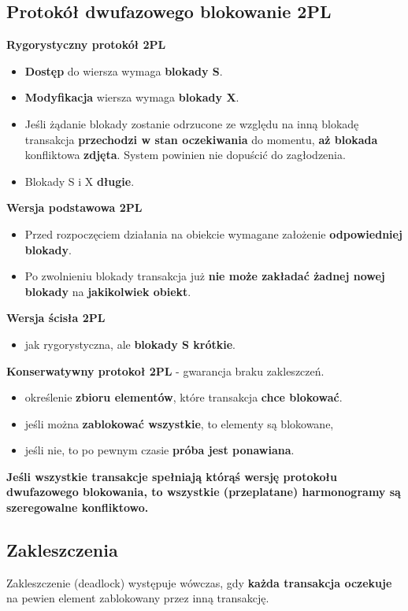 \documentclass[a4paper]{article}
\begin{document}
\subsection{Protokół dwufazowego blokowanie 2PL}
\textbf{Rygorystyczny protokół 2PL}
\begin{itemize}
    \item \textbf{Dostęp} do wiersza wymaga \textbf{blokady S}.
    \item \textbf{Modyfikacja} wiersza wymaga \textbf{blokady X}.
    \item Jeśli	żądanie	blokady	zostanie odrzucone ze względu na inną blokadę transakcja \textbf{ przechodzi w stan oczekiwania} do momentu, \textbf{aż blokada} konfliktowa \textbf{zdjęta}. System powinien nie dopuścić do zagłodzenia.
    \item Blokady S i X \textbf{długie}.
\end{itemize}
\textbf{Wersja podstawowa 2PL}
\begin{itemize}
    \item Przed	rozpoczęciem działania na obiekcie wymagane założenie \textbf{odpowiedniej blokady}.
    \item Po zwolnieniu  blokady transakcja już \textbf{nie może zakładać żadnej nowej blokady} na \textbf{jakikolwiek obiekt}.
\end{itemize}
\textbf{Wersja ścisła 2PL} 
\begin{itemize} 
    \item jak rygorystyczna, ale \textbf{blokady S krótkie}.
\end{itemize}
\textbf{Konserwatywny protokoł 2PL} - gwarancja braku zakleszczeń.
\begin{itemize}
    \item określenie \textbf{zbioru elementów}, które transakcja \textbf{chce blokować}.
    \item jeśli można \textbf{zablokować wszystkie}, to elementy są blokowane,
    \item jeśli nie, to po pewnym czasie \textbf{próba	jest ponawiana}.
\end{itemize}

\textbf{Jeśli	wszystkie	transakcje	spełniają którąś wersję protokołu dwufazowego	blokowania,	to	wszystkie	(przeplatane) harmonogramy	są	szeregowalne	konfliktowo.}

\subsection{Zakleszczenia}
Zakleszczenie (deadlock) występuje wówczas, gdy	\textbf{każda	 transakcja oczekuje} na	 pewien	element	 zablokowany przez inną transakcję.
\end{document}
